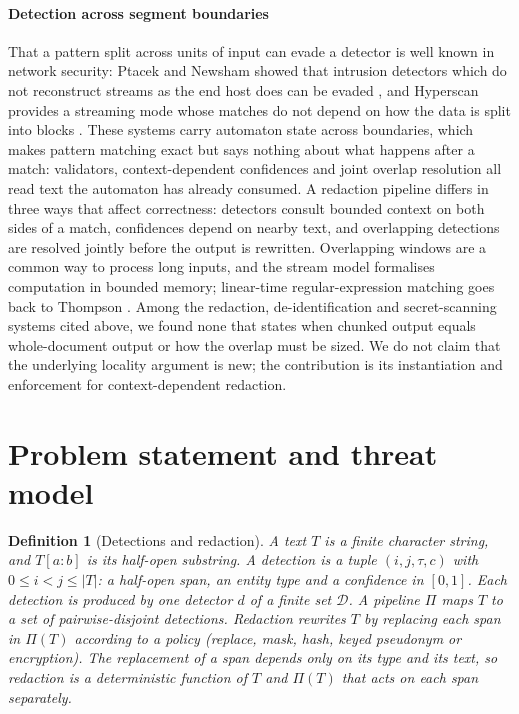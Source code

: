 \documentclass[pdflatex,sn-mathphys-num]{sn-jnl}
\theoremstyle{thmstyleone}
\theoremstyle{thmstylethree}
\newtheorem{definition}{Definition}
\begin{document}
\paragraph{Detection across segment boundaries}
That a pattern split across units of input can evade a detector is well known in network security: Ptacek and Newsham showed that intrusion detectors which do not reconstruct streams as the end host does can be evaded \cite{ptacek1998insertion}, and Hyperscan \cite{wang2019hyperscan} provides a streaming mode whose matches do not depend on how the data is split into blocks \cite{intel2019hyperscanintro}. These systems carry automaton state across boundaries, which makes pattern matching exact but says nothing about what happens after a match: validators, context-dependent confidences and joint overlap resolution all read text the automaton has already consumed. A redaction pipeline differs in three ways that affect correctness: detectors consult bounded context on both sides of a match, confidences depend on nearby text, and overlapping detections are resolved jointly before the output is rewritten. Overlapping windows are a common way to process long inputs, and the stream model \cite{muthukrishnan2005streams} formalises computation in bounded memory; linear-time regular-expression matching goes back to Thompson \cite{thompson1968regex}. Among the redaction, de-identification and secret-scanning systems cited above, we found none that states when chunked output equals whole-document output or how the overlap must be sized. We do not claim that the underlying locality argument is new; the contribution is its instantiation and enforcement for context-dependent redaction.

\section{Problem statement and threat model}\label{sec:problem}

\begin{definition}[Detections and redaction]\label{def:det}
A text $T$ is a finite character string, and $T[a{:}b]$ is its half-open substring. A \emph{detection} is a tuple $(i, j, \tau, c)$ with $0 \le i < j \le |T|$: a half-open span, an entity type and a confidence in $[0,1]$. Each detection is produced by one detector $d$ of a finite set $\mathcal{D}$. A \emph{pipeline} $\Pi$ maps $T$ to a set of pairwise-disjoint detections. \emph{Redaction} rewrites $T$ by replacing each span in $\Pi(T)$ according to a policy (replace, mask, hash, keyed pseudonym or encryption). The replacement of a span depends only on its type and its text, so redaction is a deterministic function of $T$ and $\Pi(T)$ that acts on each span separately.
\end{definition}
\end{document}
